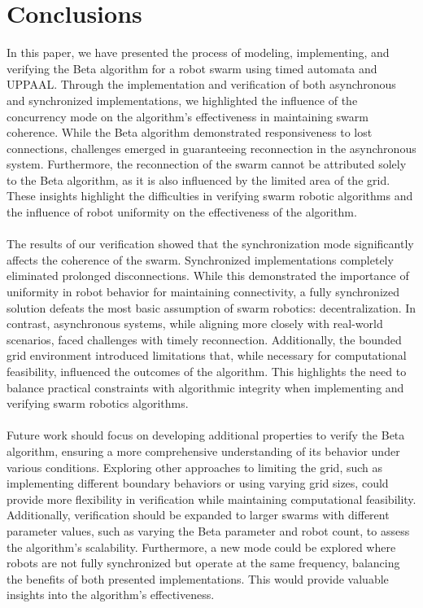 \section{Conclusions}
In this paper, we have presented the process of modeling, implementing, and verifying the Beta algorithm for a robot swarm using timed automata and UPPAAL. Through the implementation and verification of both asynchronous and synchronized implementations, we highlighted the influence of the concurrency mode on the algorithm's effectiveness in maintaining swarm coherence. While the Beta algorithm demonstrated responsiveness to lost connections, challenges emerged in guaranteeing reconnection in the asynchronous system. Furthermore, the reconnection of the swarm cannot be attributed solely to the Beta algorithm, as it is also influenced by the limited area of the grid. These insights highlight the difficulties in verifying swarm robotic algorithms and the influence of robot uniformity on the effectiveness of the algorithm.
\\\\
The results of our verification showed that the synchronization mode significantly affects the coherence of the swarm. Synchronized implementations completely eliminated prolonged disconnections. While this demonstrated the importance of uniformity in robot behavior for maintaining connectivity, a fully synchronized solution defeats the most basic assumption of swarm robotics: decentralization. In contrast, asynchronous systems, while aligning more closely with real-world scenarios, faced challenges with timely reconnection. Additionally, the bounded grid environment introduced limitations that, while necessary for computational feasibility, influenced the outcomes of the algorithm. This highlights the need to balance practical constraints with algorithmic integrity when implementing and verifying swarm robotics algorithms.
\\\\
Future work should focus on developing additional properties to verify the Beta algorithm, ensuring a more comprehensive understanding of its behavior under various conditions. Exploring other approaches to limiting the grid, such as implementing different boundary behaviors or using varying grid sizes, could provide more flexibility in verification while maintaining computational feasibility. Additionally, verification should be expanded to larger swarms with different parameter values, such as varying the Beta parameter and robot count, to assess the algorithm’s scalability. Furthermore, a new mode could be explored where robots are not fully synchronized but operate at the same frequency, balancing the benefits of both presented implementations. This would provide valuable insights into the algorithm's effectiveness.
